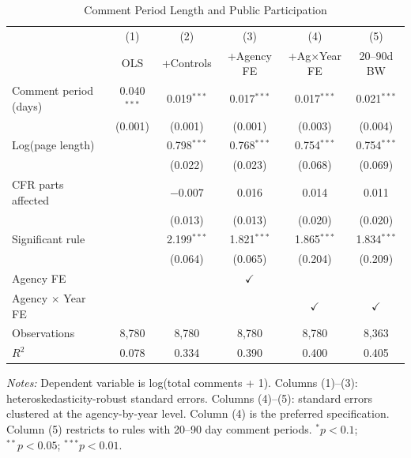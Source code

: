 \begin{table}[t]
\centering
\caption{Comment Period Length and Public Participation}
\label{tab:main}
\begin{threeparttable}
\small
\begin{tabular}{lccccc}
\toprule
 & (1) & (2) & (3) & (4) & (5) \\
 & OLS & +Controls & +Agency FE & +Ag$\times$Year FE & 20--90d BW \\
\midrule
Comment period (days) & 0.040$^{***}$ & 0.019$^{***}$ & 0.017$^{***}$ & 0.017$^{***}$ & 0.021$^{***}$ \\
 & (0.001) & (0.001) & (0.001) & (0.003) & (0.004) \\[3pt]
Log(page length) & & 0.798$^{***}$ & 0.768$^{***}$ & 0.754$^{***}$ & 0.754$^{***}$ \\
 & & (0.022) & (0.023) & (0.068) & (0.069) \\[3pt]
CFR parts affected & & $-$0.007 & 0.016 & 0.014 & 0.011 \\
 & & (0.013) & (0.013) & (0.020) & (0.020) \\[3pt]
Significant rule & & 2.199$^{***}$ & 1.821$^{***}$ & 1.865$^{***}$ & 1.834$^{***}$ \\
 & & (0.064) & (0.065) & (0.204) & (0.209) \\[6pt]
Agency FE & & & $\checkmark$ & & \\
Agency $\times$ Year FE & & & & $\checkmark$ & $\checkmark$ \\
Observations & 8,780 & 8,780 & 8,780 & 8,780 & 8,363 \\
$R^2$ & 0.078 & 0.334 & 0.390 & 0.400 & 0.405 \\
\bottomrule
\end{tabular}
\begin{tablenotes}
\small
\item \textit{Notes:} Dependent variable is log(total comments + 1). Columns (1)--(3): heteroskedasticity-robust standard errors. Columns (4)--(5): standard errors clustered at the agency-by-year level. Column (4) is the preferred specification. Column (5) restricts to rules with 20--90 day comment periods. $^{*}p<0.1$; $^{**}p<0.05$; $^{***}p<0.01$.
\end{tablenotes}
\end{threeparttable}
\end{table}
